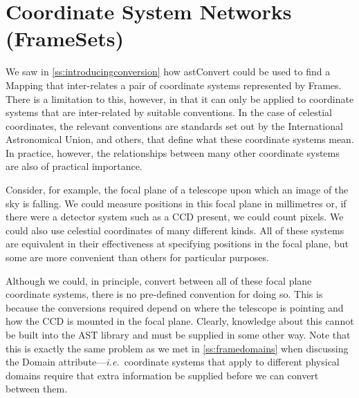 \documentclass[twoside,11pt]{article}
\newcommand{\htmlref}[2]{#1}
\newcommand{\secref}[1]{\S\ref{#1}}
\renewcommand{\secref}[1]{\ref{#1}}
\begin{document}
%
%

\cleardoublepage
%
\section{\label{ss:framesets}Coordinate System Networks (FrameSets)}

We saw in \secref{ss:introducingconversion} how \htmlref{astConvert}{astConvert} could be
used to find a \htmlref{Mapping}{Mapping} that inter-relates a pair of coordinate systems
represented by Frames. There is a limitation to this, however, in that
it can only be applied to coordinate systems that are inter-related by
suitable conventions. In the case of celestial coordinates, the
relevant conventions are standards set out by the International
Astronomical Union, and others, that define what these coordinate
systems mean. In practice, however, the relationships between many
other coordinate systems are also of practical importance.

Consider, for example, the focal plane of a telescope upon which an
image of the sky is falling. We could measure positions in this focal
plane in millimetres or, if there were a detector system such as a CCD
present, we could count pixels. We could also use celestial
coordinates of many different kinds. All of these systems are
equivalent in their effectiveness at specifying positions in the focal
plane, but some are more convenient than others for particular
purposes.

Although we could, in principle, convert between all of these focal
plane coordinate systems, there is no pre-defined convention for doing
so. This is because the conversions required depend on where the
telescope is pointing and how the CCD is mounted in the focal
plane. Clearly, knowledge about this cannot be built into the AST
library and must be supplied in some other way. Note that this is
exactly the same problem as we met in \secref{ss:framedomains} when
discussing the \htmlref{Domain}{Domain} attribute---{\em{i.e.}}\ coordinate systems that
apply to different physical domains require that extra information be
supplied before we can convert between them.
\end{document}
